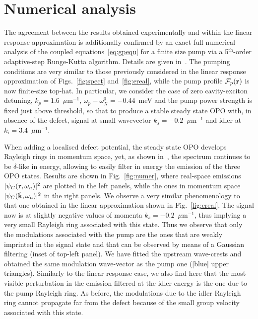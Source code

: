 \section{Numerical analysis}
%
The agreement between the results obtained experimentally and within
the linear response approximation is additionally confirmed by an
exact full numerical analysis of the coupled
equations~\eqref{eq:gpequ} for a finite size pump via a
5$^{\text{th}}$-order adaptive-step Runge-Kutta algorithm.
%
Details are given in~\cite{SM}.
%
The pumping conditions are very similar to those previously considered
in the linear response approximation of Figs.~\ref{fig:spect}
and~\ref{fig:ereal}, while the pump profile $\mathcal{F}_p(\mathbf{r})$
is now finite-size top-hat. In particular, we consider the case of
zero cavity-exciton detuning, $k_p=1.6$~$\mu$m$^{-1}$,
$\omega_p-\omega_X^0 = -0.44$~meV and the pump power strength is fixed
just above threshold, so that to produce a stable steady state OPO
with, in absence of the defect, signal at small wavevector
$k_s=-0.2$~$\mu$m$^{-1}$ and idler at $k_i=3.4$~$\mu$m$^{-1}$.

When adding a localised defect potential, the steady state OPO
develops Rayleigh rings in momentum space, yet, as shown in~\cite{SM},
the spectrum continues to be $\delta$-like in energy, allowing to
easily filter in energy the emission of the three OPO states.
%
Results are shown in Fig.~\ref{fig:numer}, where real-space emissions
$|\psi_C (\mathbf{r},\omega_n)|^2$ are plotted in the left panels, while
the ones in momentum space $|\psi_C (\tilde{\mathbf{k}},\omega_n)|^2$ in
the right panels. We observe a very similar phenomenology to that one
obtained in the linear approximation shown in
Fig.~\ref{fig:ereal}. The signal now is at slightly negative values of
momenta $k_s=-0.2$~$\mu$m$^{-1}$, thus implying a very small Rayleigh
ring associated with this state. Thus we observe that only the
modulations associated with the pump are the ones that are weakly
imprinted in the signal state and that can be observed by means of a
Gaussian filtering (inset of top-left panel). We have fitted the
upstream wave-crests and obtained the same modulation wave-vector as
the pump one ([blue] upper triangles). Similarly to the linear
response case, we also find here that the most visible perturbation in
the emission filtered at the idler energy is the one due to the pump
Rayleigh ring. As before, the modulations due to the idler Rayleigh
ring cannot propagate far from the defect because of the small group
velocity associated with this state.


